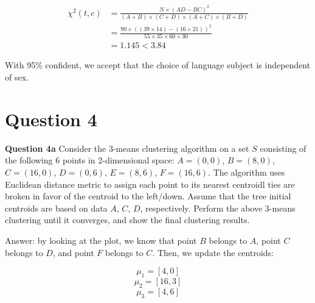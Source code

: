\documentclass[11pt,a4paper]{report}
\begin{document}
\begin{multicols*}{2}
\begin{equation*}
\begin{split}
   \chi^2(t,c) &= \frac{N\times (AD - BC)^2}{(A+B) \times (C+D) \times (A+C) \times (B+D)} \\
   &= \frac{90\times ((39 \times 14) - (16 \times 21))^2}{55\times 35 \times 60 \times 30}\\
   &= 1.145 < 3.84
\end{split}
\end{equation*}

\noindent With 95\% confident, we accept that the choice of language subject is independent of sex. 

\section{Question 4}

\noindent \textbf{Question 4a} Consider the 3-means clustering algorithm on a set $S$ consisting of the following 6 points in 2-dimensional space: $A=(0,0)$, $B=(8,0)$, $C=(16,0)$, $D=(0,6)$, $E=(8,6)$, $F=(16,6)$. The algorithm uses Euclidean distance metric to assign each point to its nearest centroidl ties are broken in favor of the centroid to the left/down. Assume that the tree initial centroids are based on data $A$, $C$, $D$, respectively. Perform the above 3-means clustering until it converges, and show the final clustering results.


\noindent Answer: by looking at the plot, we know that point $B$ belongs to $A$, point $C$ belongs to $D$, and point $F$ belongs to $C$. Then, we update the centroids:

$$\mu_1 = [4,0]$$
$$\mu_2 = [16,3]$$
$$\mu_3 = [4,6]$$



\end{multicols*}
\end{document}
